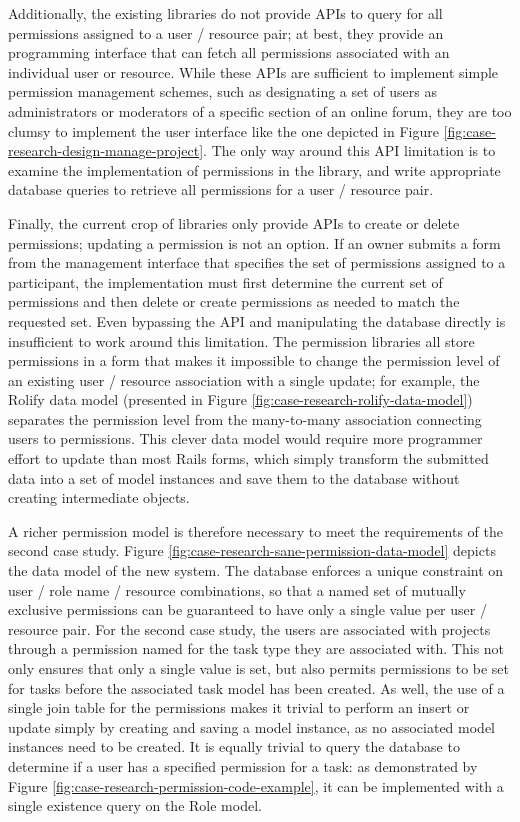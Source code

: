 \documentclass[document.tex]{subfiles}
\begin{document}
Additionally, the existing libraries do not provide APIs to query for all permissions assigned to a user / resource pair; at best, they provide an programming interface that can fetch all permissions associated with an individual user or resource.
While these APIs are sufficient to implement simple permission management schemes, such as designating a set of users as administrators or moderators of a specific section of an online forum, they are too clumsy to implement the user interface like the one depicted in Figure \ref{fig:case-research-design-manage-project}.
The only way around this API limitation is to examine the implementation of permissions in the library, and write appropriate database queries to retrieve all permissions for a user / resource pair.

Finally, the current crop of libraries only provide APIs to create or delete permissions; updating a permission is not an option.
If an owner submits a form from the management interface that specifies the set of permissions assigned to a participant, the implementation must first determine the current set of permissions and then delete or create permissions as needed to match the requested set.
Even bypassing the API and manipulating the database directly is insufficient to work around this limitation.
The permission libraries all store permissions in a form that makes it impossible to change the permission level of an existing user / resource association with a single update; for example, the Rolify data model (presented in Figure \ref{fig:case-research-rolify-data-model}) separates the permission level from the many-to-many association connecting users to permissions.
This clever data model would require more programmer effort to update than most Rails forms, which simply transform the submitted data into a set of model instances and save them to the database without creating intermediate objects.

A richer permission model is therefore necessary to meet the requirements of the second case study.
Figure \ref{fig:case-research-sane-permission-data-model} depicts the data model of the new system.
The database enforces a unique constraint on user / role name / resource combinations, so that a named set of mutually exclusive permissions can be guaranteed to have only a single value per user / resource pair.
For the second case study, the users are associated with projects through a permission named for the task type they are associated with.
This not only ensures that only a single value is set, but also permits permissions to be set for tasks before the associated task model has been created.
As well, the use of a single join table for the permissions makes it trivial to perform an insert or update simply by creating and saving a model instance, as no associated model instances need to be created.
It is equally trivial to query the database to determine if a user has a specified permission for a task: as demonstrated by Figure \ref{fig:case-research-permission-code-example}, it can be implemented with a single existence query on the Role model.
\end{document}
